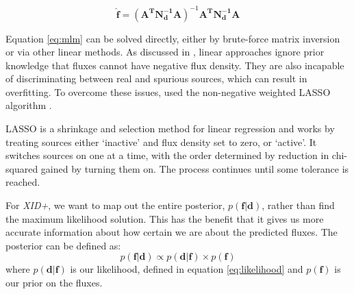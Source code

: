 \documentclass[useAMS,usenatbib]{mnras}
\begin{document}
\begin{equation}
\hat{\mathbf{f}}=(\mathbf{A^TN_d^{-1}A})^{-1}\mathbf{A^TN_d^{-1}A}\label{eq:mlm}
\end{equation}

Equation \ref{eq:mlm} can be solved directly, either by brute-force matrix inversion or via other linear methods. As discussed in \cite{Roseboom:2010, Roseboom:2011, Wang:2014}, linear approaches ignore prior knowledge that fluxes cannot have negative flux density.%
 They are also incapable of discriminating between real and spurious sources, which can result in overfitting. To overcome these issues, \cite{Roseboom:2011} used the non-negative weighted LASSO algorithm \citep{Tibshirani:1996, Zou:2006, terBraak:2010}.

LASSO is a shrinkage and selection method for linear regression and works by treating sources either `inactive' and flux density set to zero, or `active'. It switches sources on one at a time, with the order determined by reduction in chi-squared gained by turning them on. The process continues until some tolerance is reached.

%

For \emph{XID+}, we want to map out the entire posterior, $p(\mathbf{f}|\mathbf{d})$, rather than find the maximum likelihood solution. This has the benefit that it gives us more accurate information about how certain we are about the predicted fluxes. The posterior can be defined as:
\begin{equation}
p(\mathbf{f}|\mathbf{d}) \propto p(\mathbf{d}|\mathbf{f}) \times p(\mathbf{f})
\end{equation}
where $p(\mathbf{d}|\mathbf{f})$ is our likelihood, defined in equation \ref{eq:likelihood} and $p(\mathbf{f})$ is our prior on the fluxes. 
\end{document}
